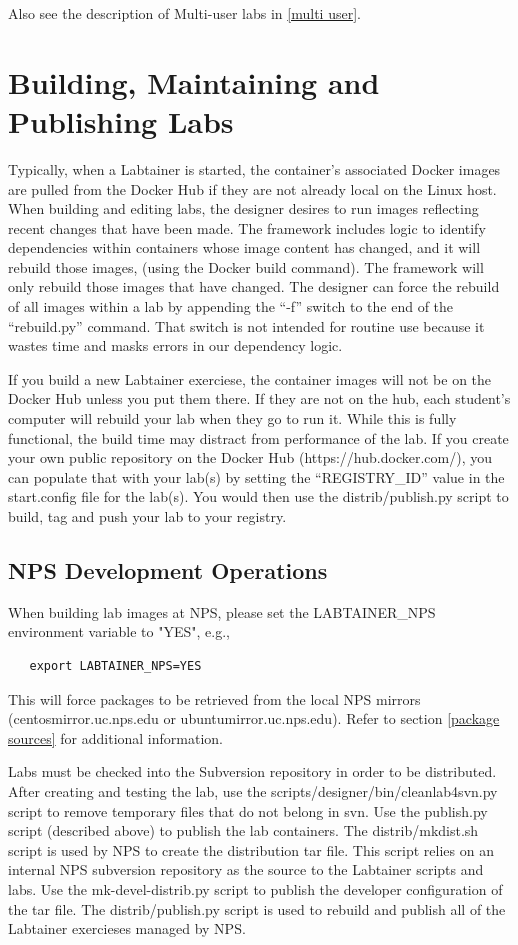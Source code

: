 \documentclass[12pt]{article}
\begin{document}
Also see the description of Multi-user labs in \ref{multi user}.

\section{Building, Maintaining and Publishing Labs} \label{publishing}
Typically, when a Labtainer is started, the container's associated Docker images are pulled from
the Docker Hub if they are not already local on the Linux host.  When building and editing labs,
the designer desires to run images reflecting recent changes that have been made.  The framework
includes logic to identify dependencies within containers whose image content has changed, 
and it will rebuild those images, (using the Docker build command).  The framework will only 
rebuild those images that have changed.  The designer can force the rebuild of all images within
a lab by appending the ``-f'' switch to the end of the ``rebuild.py'' command.  That switch is not
intended for routine use because it wastes time and masks errors in our dependency logic.

If you build a new Labtainer exerciese, the container images will not be on the Docker Hub unless you put
them there.  If they are not on the hub, each student's computer will rebuild your lab when they go to run it.
While this is fully functional, the build time may distract from performance of the lab.  If you
create your own public repository on the Docker Hub (https://hub.docker.com/), you can populate that
with your lab(s) by setting the ``REGISTRY\_ID'' value in the start.config file for the lab(s). You
would then use the distrib/publish.py script to build, tag and push your lab to your registry.

\subsection{NPS Development Operations}
When building lab images at NPS, please set the LABTAINER\_NPS environment variable to "YES", e.g.,
\begin{verbatim}
   export LABTAINER_NPS=YES
\end{verbatim}
This will force packages to be retrieved from the local NPS mirrors (centosmirror.uc.nps.edu or
ubuntumirror.uc.nps.edu).  Refer to section \ref{package sources} for additional information.

Labs must be checked into the Subversion repository in order to be distributed.  After creating and testing
the lab, use the scripts/designer/bin/cleanlab4svn.py script to remove temporary files that do not belong in 
svn.  Use the publish.py script (described above) to publish the lab containers.
The distrib/mkdist.sh script is used by NPS to create the distribution tar file.  This script relies on
an internal NPS subversion repository as the source to the Labtainer scripts and labs.  Use the mk-devel-distrib.py script
to publish the developer configuration of the tar file.  The distrib/publish.py script is used to rebuild and 
publish all of the Labtainer exercieses managed by NPS.
\end{document}
